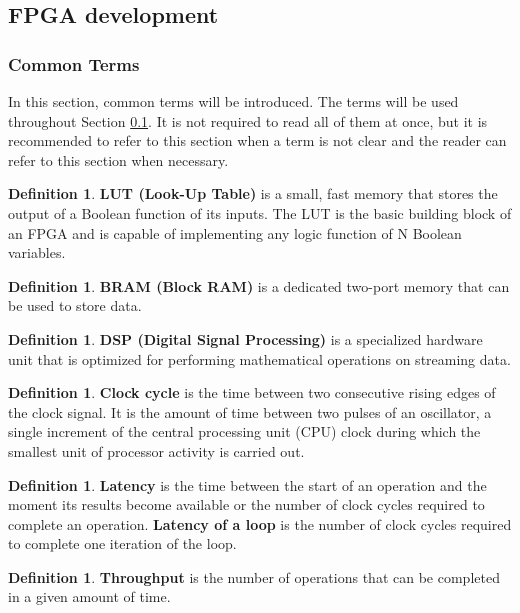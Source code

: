 \documentclass[a4paper, twoside]{report}
\theoremstyle{definition}
\newtheorem{definition}[theorem]{Definition}
\numberwithin{equation}{section}
\begin{document}
\subsection{FPGA development} \label{sec:fpga_development}

\subsubsection{Common Terms}

In this section, common terms will be introduced.
The terms will be used throughout Section \ref{sec:fpga_development}.
It is not required to read all of them at once, but it is recommended to refer to this section
when a term is not clear and the reader can refer to this section when necessary.

\begin{definition}
    \textbf{LUT (Look-Up Table)} is a small, fast memory that stores the output of a Boolean function of its inputs.
    The LUT is the basic building block of an FPGA and is capable of implementing any logic function of N Boolean variables.
\end{definition}
\begin{definition}
    \textbf{BRAM (Block RAM)} is a dedicated two-port memory that can be used to store data.
\end{definition}
\begin{definition}
    \textbf{DSP (Digital Signal Processing)} is a specialized hardware unit that is optimized for performing mathematical operations on streaming data.
\end{definition}
\begin{definition}
    \textbf{Clock cycle} is the time between two consecutive rising edges of the clock signal.
    It is the amount of time between two pulses of an oscillator, a single increment of the
    central processing unit (CPU) clock during which the smallest unit of processor activity
    is carried out.
\end{definition}
\begin{definition}
    \textbf{Latency} is the time between the start of an operation and the moment its results become available
    or the number of clock cycles required to complete an operation.
    \textbf{Latency of a loop} is the number of clock cycles required to complete one iteration of the loop.
\end{definition}
\begin{definition}
    \textbf{Throughput} is the number of operations that can be completed in a given amount of time.
\end{definition}
\end{document}
